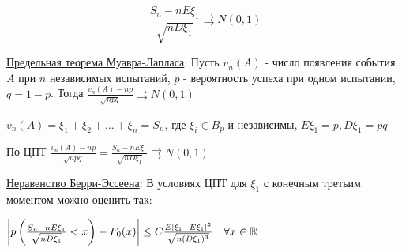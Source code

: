 \documentclass[12pt]{article}
\begin{document}
\begin{enumerate}
    \[\frac{S_n - nE\xi_1}{\sqrt{nD\xi_1}} \rightrightarrows N(0, 1)\]

    \hyperlink{limittheoremdemoivrelaplace}{Предельная теорема Муавра-Лапласа}: Пусть $v_n(A)$ - число появления события $A$ при $n$ независимых испытаний, $p$ - вероятность успеха при одном испытании, $q = 1 - p$.
    Тогда $\frac{v_n(A) - np}{\sqrt{npq}} \rightrightarrows N(0, 1)$

    \begin{MyProof}
        $v_n(A) = \xi_1 + \xi_2 + \dots + \xi_n = S_n$, где $\xi_i \in B_p$ и независимы, $E\xi_1 = p, D\xi_1 = pq$

        По ЦПТ $\frac{v_n(A) - np}{\sqrt{npq}} = \frac{S_n - nE\xi_1}{\sqrt{nD\xi_1}} \rightrightarrows N(0, 1)$
    \end{MyProof}

    \hyperlink{berryesseentheorem}{Неравенство Берри-Эссеена}: В условиях ЦПТ для $\xi_1$ с конечным третьим моментом можно оценить так:

    $\left|p\left(\frac{S_n - nE\xi_1}{\sqrt{nD\xi_1}} < x\right) - F_0(x)\right| \leq C\frac{E|\xi_1 - E\xi_1|^3}{\sqrt{n(D\xi_1)^3}} \quad \forall x \in \mathbb{R}$


\end{enumerate}

\end{document}

